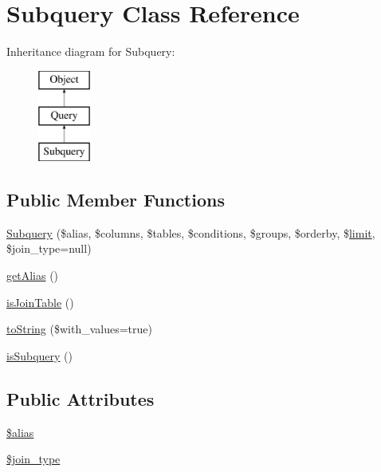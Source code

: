 \hypertarget{classSubquery}{}\section{Subquery Class Reference}
\label{classSubquery}
Inheritance diagram for Subquery\+:\begin{figure}[H]
\begin{center}
\leavevmode
\includegraphics[height=3.000000cm]{classSubquery}
\end{center}
\end{figure}
\subsection*{Public Member Functions}
\begin{DoxyCompactItemize}
\item 
\hyperlink{classSubquery_a9751ca36266ff88cab76d76e73011ea5}{Subquery} (\$alias, \$columns, \$tables, \$conditions, \$groups, \$orderby, \$\hyperlink{classQuery_af2e290d02d3e8c157f9b85b9da1ac08c}{limit}, \$join\+\_\+type=null)
\item 
\hyperlink{classSubquery_a6e48c79aecdeae3623d9b67b77e15a0e}{get\+Alias} ()
\item 
\hyperlink{classSubquery_a92a4ae32701020381a7725d625926260}{is\+Join\+Table} ()
\item 
\hyperlink{classSubquery_a3a5a5fe8693b68cb0b2745d75fe134fc}{to\+String} (\$with\+\_\+values=true)
\item 
\hyperlink{classSubquery_adea0bfe78ba0f6318fa9f181286e1482}{is\+Subquery} ()
\end{DoxyCompactItemize}
\subsection*{Public Attributes}
\begin{DoxyCompactItemize}
\item 
\hyperlink{classSubquery_a098cb0b2df506793d52ac6b29ca07dae}{\$alias}
\item 
\hyperlink{classSubquery_a20cab7ece0fb2ed4db3c5db11ed8ccc6}{\$join\+\_\+type}
\end{DoxyCompactItemize}


